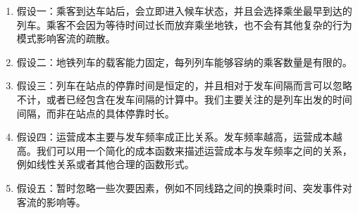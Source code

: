 
\begin{enumerate}
    \item 假设一：乘客到达车站后，会立即进入候车状态，并且会选择乘坐最早到达的列车。乘客不会因为等待时间过长而放弃乘坐地铁，也不会有其他复杂的行为模式影响客流的疏散。
    \item 假设二：地铁列车的载客能力固定，每列列车能够容纳的乘客数量是有限的。
    \item 假设三：列车在站点的停靠时间是恒定的，并且相对于发车间隔而言可以忽略不计，或者已经包含在发车间隔的计算中。我们主要关注的是列车出发的时间间隔，而非在站点的具体停靠时长。
    \item 假设四：运营成本主要与发车频率成正比关系。发车频率越高，运营成本越高。我们可以用一个简化的成本函数来描述运营成本与发车频率之间的关系，例如线性关系或者其他合理的函数形式。
    \item 假设五：暂时忽略一些次要因素，例如不同线路之间的换乘时间、突发事件对客流的影响等。
\end{enumerate}



\begin{table}[ht]
    \centering

    \renewcommand\arraystretch{1.5}
    
\end{table}
